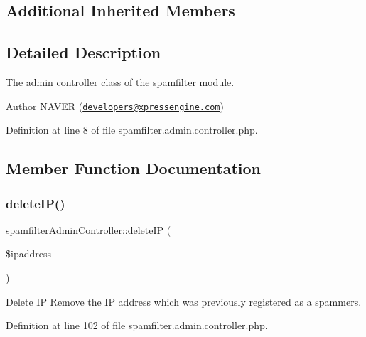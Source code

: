 \subsection*{Additional Inherited Members}


\subsection{Detailed Description}
The admin controller class of the spamfilter module. 

\begin{DoxyAuthor}{Author}
N\+A\+V\+ER (\href{mailto:developers@xpressengine.com}{\tt developers@xpressengine.\+com}) 
\end{DoxyAuthor}


Definition at line 8 of file spamfilter.\+admin.\+controller.\+php.



\subsection{Member Function Documentation}
\hypertarget{classspamfilterAdminController_a19442650a60b49972b158d12a978fcf9}{}\label{classspamfilterAdminController_a19442650a60b49972b158d12a978fcf9} 
\subsubsection{\texorpdfstring{delete\+I\+P()}{deleteIP()}}
{\footnotesize\ttfamily spamfilter\+Admin\+Controller\+::delete\+IP (\begin{DoxyParamCaption}\item[{}]{\$ipaddress }\end{DoxyParamCaption})}



Delete IP Remove the IP address which was previously registered as a spammers. 



Definition at line 102 of file spamfilter.\+admin.\+controller.\+php.

\hypertarget{classspamfilterAdminController_a57a1cc55622637f806f416da03952ccc}{}\label{classspamfilterAdminController_a57a1cc55622637f806f416da03952ccc} 
